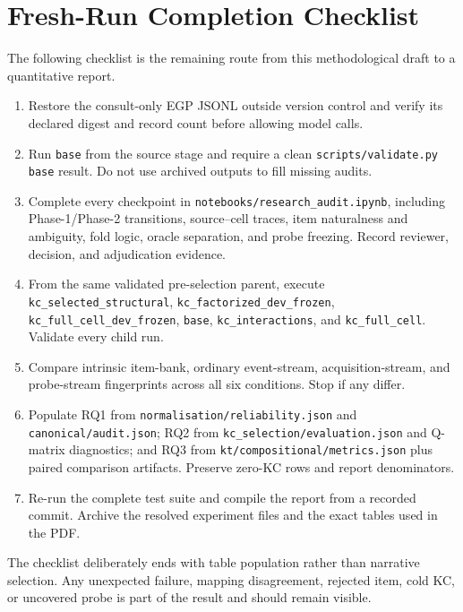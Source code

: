 \section{Fresh-Run Completion Checklist}
\label{sec:completion-checklist}

The following checklist is the remaining route from this methodological draft
to a quantitative report.

\begin{enumerate}
  \raggedright
  \item Restore the consult-only EGP JSONL outside version control and verify
        its declared digest and record count before allowing model calls.
  \item Run \texttt{base} from the source stage and require a clean
        \texttt{scripts/validate.py base} result.  Do not use archived outputs
        to fill missing audits.
  \item Complete every checkpoint in
        \texttt{notebooks/research\_audit.ipynb}, including Phase-1/Phase-2
        transitions, source--cell traces, item naturalness and ambiguity, fold
        logic, oracle separation, and probe freezing.  Record reviewer,
        decision, and adjudication evidence.
  \item From the same validated pre-selection parent, execute
        \texttt{kc\_selected\_structural},
        \texttt{kc\_factorized\_dev\_frozen},
        \texttt{kc\_full\_cell\_dev\_frozen},
        \texttt{base}, \texttt{kc\_interactions}, and
        \texttt{kc\_full\_cell}.  Validate every child run.
  \item Compare intrinsic item-bank, ordinary event-stream, acquisition-stream,
        and probe-stream fingerprints across all six conditions.  Stop if any
        differ.
  \item Populate RQ1 from \texttt{normalisation/reliability.json} and
        \texttt{canonical/audit.json}; RQ2 from
        \texttt{kc\_selection/evaluation.json} and Q-matrix diagnostics; and
        RQ3 from \texttt{kt/compositional/metrics.json} plus paired comparison
        artifacts.  Preserve zero-KC rows and report denominators.
  \item Re-run the complete test suite and compile the report from a recorded
        commit.  Archive the resolved experiment files and the exact tables
        used in the PDF.
\end{enumerate}

The checklist deliberately ends with table population rather than narrative
selection.  Any unexpected failure, mapping disagreement, rejected item, cold
KC, or uncovered probe is part of the result and should remain visible.
